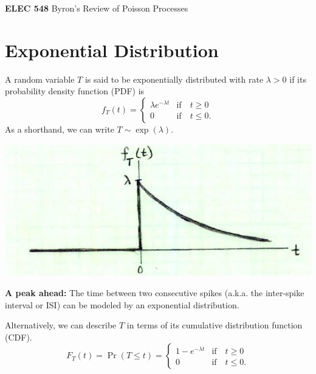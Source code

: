 \documentclass[11pt]{article}
\begin{document}
\setmainfont{Myriad Pro} %

\begin{center}
\large
\textbf{ELEC 548} Byron's Review of Poisson Processes
\end{center}

\section{Exponential Distribution}
A random variable $T$ is said to be exponentially distributed with rate $\lambda > 0$ if its probability
density function (PDF) is
\begin{equation}
f_T(t) = \begin{cases} \lambda e^{-\lambda t} & \text{if} \quad t \geq 0 \\ 0 & \text{if} \quad t \leq 0. \end{cases}
\end{equation}
As a shorthand, we can write $T \sim \exp(\lambda)$.

\begin{center}
\includegraphics[scale=0.5]{Figure1.jpg}
\end{center}

{\bf A peak ahead:} The time between two consecutive spikes (a.k.a. the inter-spike interval or ISI) can be modeled by an
exponential distribution.

Alternatively, we can describe $T$ in terms of its cumulative distribution function (CDF).
\begin{equation}
F_T(t) = \Pr (T \leq t) = \begin{cases} 1 - e^{-\lambda t} & \text{if} \quad t \geq 0 \\ 0 & \text{if} \quad t \leq 0. \end{cases}
\end{equation}
\end{document}
